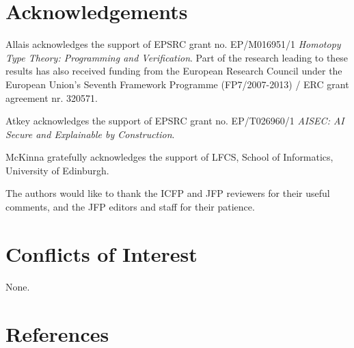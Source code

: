 \documentclass{jfp}
\begin{document}


\section*{Acknowledgements}

Allais acknowledges the support of EPSRC grant no. EP/M016951/1
\emph{Homotopy Type Theory: Programming and Verification}.
Part of the research leading to these results has also received funding from
the European Research Council under the European Union’s Seventh Framework
Programme (FP7/2007-2013) / ERC grant agreement nr. 320571.

Atkey acknowledges the support of EPSRC grant no. EP/T026960/1
\emph{AISEC: AI Secure and Explainable by Construction}.

McKinna gratefully acknowledges the support of LFCS, School of Informatics, University of Edinburgh.

The authors would like to thank the ICFP and JFP reviewers for their
useful comments, and the JFP editors and staff for their patience.

\section*{Conflicts of Interest}

None.


\renewcommand{\bibsection}{}
\section*{References}



\label{lastpage01}
\end{document}
